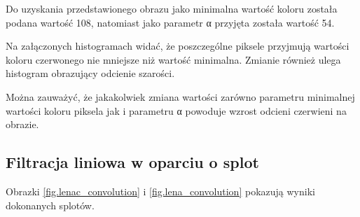 \documentclass{classrep}
\begin{document}
Do uzyskania przedstawionego obrazu jako minimalna wartość koloru została podana wartość 108, natomiast jako parametr α przyjęta została wartość 54.

Na załączonych histogramach widać, że poszczególne piksele przyjmują wartości koloru czerwonego nie mniejsze niż wartość minimalna. Zmianie również ulega histogram obrazujący odcienie szarości.

Można zauważyć, że jakakolwiek zmiana wartości zarówno parametru minimalnej wartości koloru piksela jak i parametru α powoduje wzrost odcieni czerwieni na obrazie.

\subsection{Filtracja liniowa w oparciu o splot}
Obrazki \ref{fig.lenac_convolution} i \ref{fig.lena_convolution} pokazują wyniki dokonanych splotów.
\end{document}
